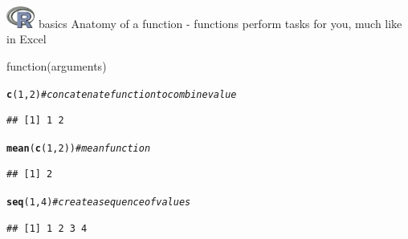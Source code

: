 \documentclass[xcolor=svgnames]{beamer}\usepackage[]{graphicx}\usepackage[]{color}
\makeatletter
\newcommand{\hlnum}[1]{\textcolor[rgb]{0.686,0.059,0.569}{#1}}%
\newcommand{\hlcom}[1]{\textcolor[rgb]{0.678,0.584,0.686}{\textit{#1}}}%
\newcommand{\hlstd}[1]{\textcolor[rgb]{0.345,0.345,0.345}{#1}}%
\newcommand{\hlkwd}[1]{\textcolor[rgb]{0.737,0.353,0.396}{\textbf{#1}}}%
\newenvironment{kframe}{%
 \def\at@end@of@kframe{}%
 \ifinner\ifhmode%
  \def\at@end@of@kframe{\end{minipage}}%
  \begin{minipage}{\columnwidth}%
 \fi\fi%
 \def\FrameCommand##1{\hskip\@totalleftmargin \hskip-\fboxsep
 \colorbox{shadecolor}{##1}\hskip-\fboxsep
     \hskip-\linewidth \hskip-\@totalleftmargin \hskip\columnwidth}%
 \MakeFramed {\advance\hsize-\width
   \@totalleftmargin\z@ \linewidth\hsize
   \@setminipage}}%
 {\par\unskip\endMakeFramed%
 \at@end@of@kframe}
\newenvironment{knitrout}{}{} %
\makeatother
\begin{document}
\begin{frame}[fragile]{\includegraphics[width=0.07\textwidth]{Rlogo.jpg} \hspace{0.01in} basics}
Anatomy of a function - functions perform tasks for you, much like in Excel
\begin{center}
\Large
function(arguments)
\end{center}
\begin{knitrout}\scriptsize
{}\color{fgcolor}\begin{kframe}
\begin{alltt}
\hlkwd{c}\hlstd{(}\hlnum{1}\hlstd{,} \hlnum{2}\hlstd{)} \hlcom{# concatenate function to combine value}
\end{alltt}
\begin{verbatim}
## [1] 1 2
\end{verbatim}
\begin{alltt}
\hlkwd{mean}\hlstd{(}\hlkwd{c}\hlstd{(}\hlnum{1}\hlstd{,} \hlnum{2}\hlstd{))} \hlcom{# mean function}
\end{alltt}
\begin{verbatim}
## [1] 2
\end{verbatim}
\begin{alltt}
\hlkwd{seq}\hlstd{(}\hlnum{1}\hlstd{,} \hlnum{4}\hlstd{)} \hlcom{# create a sequence of values}
\end{alltt}
\begin{verbatim}
## [1] 1 2 3 4
\end{verbatim}
\end{kframe}
\end{knitrout}
\end{frame}
\end{document}
